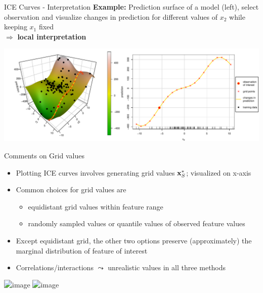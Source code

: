 \documentclass[11pt,compress,t,notes=noshow, aspectratio=169, xcolor=table]{beamer}
\begin{document}
\begin{frame}{ICE Curves - Interpretation}
\textbf{Example:} Prediction surface of a model (left), select observation and visualize changes in prediction for different values of $x_2$ while keeping $x_1$ fixed \\ $\Rightarrow$ \textbf{local interpretation}

\bigskip
\centering
\includegraphics[width=\textwidth]{figure/ice_motivation}

\end{frame}


\begin{frame}{Comments on Grid values}
\begin{itemize}
\item Plotting ICE curves involves generating grid values $\xv_S^*$; visualized on x-axis
\item Common choices for grid values are
\begin{itemize}
\item equidistant grid values within feature range
\item randomly sampled values or quantile values of observed feature values
\end{itemize}
\item Except equidistant grid, the other two options preserve (approximately) the marginal distribution of feature of interest
\item<2> Correlations/interactions $\leadsto$ unrealistic values in all three methods
\end{itemize}

\vspace{0.3cm}
\centering
\includegraphics<1>[width=0.85\textwidth, trim=0cm 0cm 0cm 0cm, clip]{figure/sampling2}
\includegraphics<2>[width=0.85\textwidth, trim=0cm 0cm 0cm 0cm, clip]{figure/sampling}


\end{frame}

\endlecture
\end{document}
